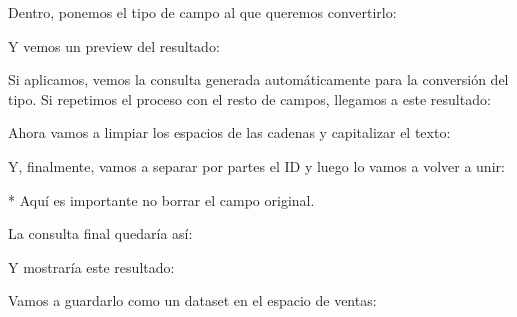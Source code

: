 \documentclass{../../../miPlantilla}
\begin{document}
Dentro, ponemos el tipo de campo al que queremos convertirlo:


Y vemos un preview del resultado:


\newpage

Si aplicamos, vemos la consulta generada automáticamente para la conversión del tipo. Si repetimos el proceso con el resto de campos, 
llegamos a este resultado:


Ahora vamos a limpiar los espacios de las cadenas y capitalizar el texto:


Y, finalmente, vamos a separar por partes el ID y luego lo vamos a volver a unir:


* Aquí es importante no borrar el campo original.


La consulta final quedaría así:


Y mostraría este resultado:


\newpage

Vamos a guardarlo como un dataset en el espacio de ventas:

\end{document}

